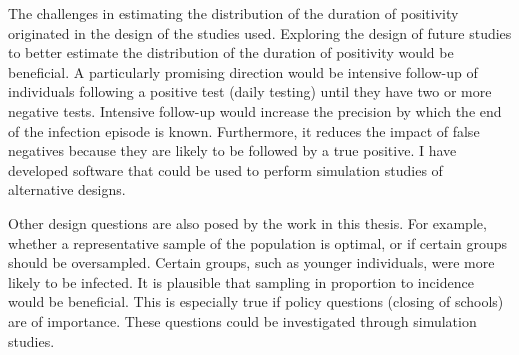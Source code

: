 \documentclass[thesis.tex]{subfiles}
\begin{document}
The challenges in estimating the distribution of the duration of positivity originated in the design of the studies used.
Exploring the design of future studies to better estimate the distribution of the duration of positivity would be beneficial.
A particularly promising direction would be intensive follow-up of individuals following a positive test (\eg daily testing) until they have two or more negative tests.
Intensive follow-up would increase the precision by which the end of the infection episode is known.
Furthermore, it reduces the impact of false negatives because they are likely to be followed by a true positive.
I have developed software that could be used to perform simulation studies of alternative designs.

Other design questions are also posed by the work in this thesis.
For example, whether a representative sample of the population is optimal, or if certain groups should be oversampled.
Certain groups, such as younger individuals, were more likely to be infected.
It is plausible that sampling in proportion to incidence would be beneficial.
This is especially true if policy questions (\eg closing of schools) are of importance.
These questions could be investigated through simulation studies.

\ifSubfilesClassLoaded{
  \listoftodos
}{}
\end{document}
